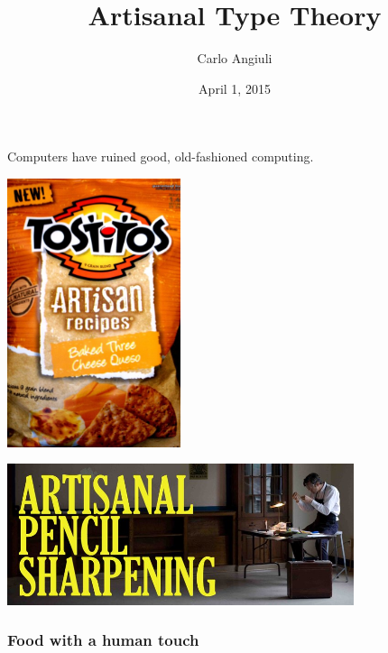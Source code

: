 \documentclass{beamer}
\title{Artisanal Type Theory}
\author{Carlo Angiuli}
\date{April 1, 2015}
\institute{Carnegie Mellon University}
\begin{document}
\begin{frame}
\maketitle
\end{frame}

\begin{frame}
\begin{center}
Computers have ruined good, old-fashioned computing.
\end{center}
\end{frame}

\begin{frame}
\begin{center}
\includegraphics[width=2in]{tostitos.jpg}
\end{center}
\end{frame}

\begin{frame}
\begin{center}
\includegraphics[width=4in]{pencil.jpg}
\end{center}
\end{frame}

\begin{frame}
\frametitle{Food with a human touch}
\end{frame}
\end{document}

